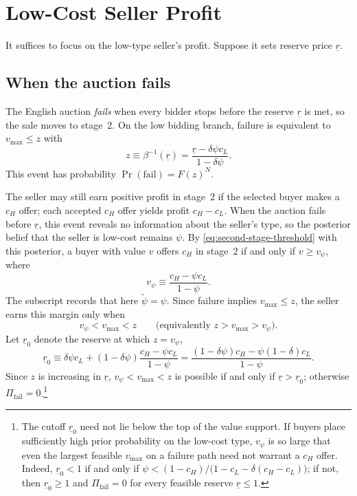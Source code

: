 \section{Low-Cost Seller Profit}
\label{sec:low-cost-profit}

It suffices to focus on the low-type seller's profit. Suppose it sets reserve
price $\underline{r}$.

\subsection{When the auction fails}
\label{subsec:profit-fail}

The English auction \emph{fails} when every bidder stops before the reserve
$\underline{r}$ is met, so the sale moves to stage~2.
On the low bidding branch, failure is equivalent to $v_{\max}\le z$ with
\begin{equation}
  z
  \equiv \beta^{-1}(\underline{r})
  = \frac{\underline{r}-\delta\psi c_L}{1-\delta\psi}.
  \label{eq:z-def}
\end{equation}
This event has probability $\Pr(\text{fail})=F(z)^{N}$.

The seller may still earn positive profit in stage~2 if the selected
buyer makes a $c_H$ offer; each accepted $c_H$ offer yields profit $c_H-c_L$.
When the auction fails before $\underline{r}$, this event reveals no information
about the seller's type, so the posterior belief that the seller is low-cost
remains $\psi$.
By \eqref{eq:second-stage-threshold} with this posterior, a buyer with value $v$
offers $c_H$ in stage~2 if and only if $v\ge v_{\psi}$, where
\begin{equation}
  v_{\psi}
  \equiv \frac{c_H-\psi c_L}{1-\psi}.
  \label{eq:v-psi-def}
\end{equation}
The subscript records that here $\tilde{\psi}=\psi$.
Since failure implies $v_{\max}\le z$, the seller earns this margin only when
\[
  v_{\psi} < v_{\max} < z
  \qquad\text{(equivalently } z > v_{\max} > v_{\psi}\text{)}.
\]
Let $\underline{r}_0$ denote the reserve at which $z=v_{\psi}$,
\begin{equation}
  \underline{r}_0
  \equiv
  \delta\psi c_L
  + (1-\delta\psi)\frac{c_H-\psi c_L}{1-\psi}
  =
  \frac{(1-\delta\psi)c_H-\psi(1-\delta)c_L}{1-\psi}.
  \label{eq:failure-positive-cutoff}
\end{equation}
Since $z$ is increasing in $\underline{r}$, $v_{\psi}<v_{\max}<z$ is possible if
and only if $\underline{r}>\underline{r}_0$; otherwise $\Pi_{\text{fail}}=0$.\footnote{%
  The cutoff $\underline{r}_0$ need not lie below the top of the value support.
  If buyers place sufficiently high prior probability on the low-cost type,
  $v_{\psi}$ is so large that even the largest feasible $v_{\max}$ on a failure
  path need not warrant a $c_H$ offer.
  Indeed,
  $\underline{r}_0<1$ if and only if
  $\psi<(1-c_H)/\bigl(1-c_L-\delta(c_H-c_L)\bigr)$;
  if not, then $\underline{r}_0\ge1$ and $\Pi_{\text{fail}}=0$ for every feasible
  reserve $\underline{r}\le1$.}

